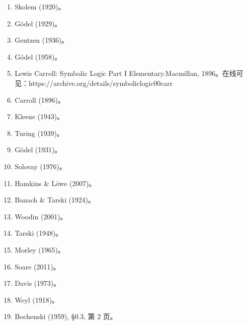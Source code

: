 \begin{enumerate}
  \item Skolem (1920)。
  \item Gödel (1929)。
  \item Gentzen (1936)。
  \item Gödel (1958)。
  \item Lewis Carroll: Symbolic Logic Part I Elementary.Macmillan, 1896。在线可见：https://archive.org/details/symboliclogic00carr
  \item Carroll (1896)。
  \item Kleene (1943)。
  \item Turing (1939)。
  \item Gödel (1931)。
  \item Solovay (1976)。
  \item Hamkins \& Löwe (2007)。
  \item Banach \& Tarski (1924)。
  \item Woodin (2001)。
  \item Tarski (1948)。
  \item Morley (1965)。
  \item Soare (2011)。
  \item Davis (1973)。
  \item Weyl (1918)。
  \item Bochenski (1959), §0.3, 第 2 页。
\end{enumerate}


